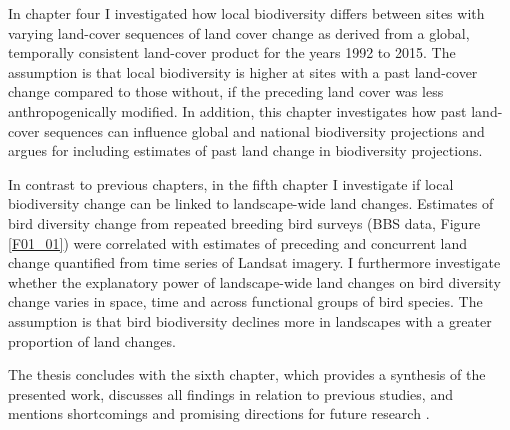 In chapter four I investigated how local biodiversity differs between sites with varying land-cover sequences of land cover change as derived from a global, temporally consistent land-cover product for the years 1992 to 2015. The assumption is that local biodiversity is higher at sites with a past land-cover change compared to those without, if the preceding land cover was less anthropogenically modified. In addition, this chapter investigates how past land-cover sequences can influence global and national biodiversity projections and argues for including estimates of past land change in biodiversity projections.

In contrast to previous chapters, in the fifth chapter I investigate if local biodiversity change can be linked to landscape-wide land changes. Estimates of bird diversity change from repeated breeding bird surveys (BBS data, Figure \ref{F01_01}) were correlated with estimates of preceding and concurrent land change quantified from time series of Landsat imagery. I furthermore investigate whether the explanatory power of landscape-wide land changes on bird diversity change varies in space, time and across functional groups of bird species. The assumption is that bird biodiversity declines more in landscapes with a greater proportion of land changes.

The thesis concludes with the sixth chapter, which provides a synthesis of the presented work, discusses all findings in relation to previous studies, and mentions shortcomings and promising directions for future research .

\clearpage
%

%  
